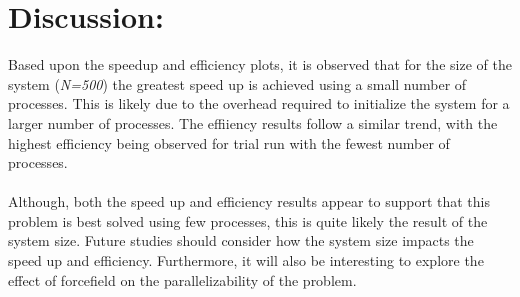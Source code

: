 \documentclass{article}
\begin{document}
\section*{Discussion:}
Based upon the speedup and efficiency plots, it is observed that
for the size of the system (\textit{N=500}) the greatest speed up
is achieved using a small number of processes.  This is likely
due to the overhead required to initialize the system for a larger
number of processes.
The effiiency results follow a similar trend, with the highest
efficiency being observed for trial run with the fewest number
of processes.\\\\
Although, both the speed up and efficiency results appear to 
support that this problem is best solved using few processes,
this is quite likely the result of the system size.  Future 
studies should consider how the system size impacts the
speed up and efficiency.  Furthermore, it will also be interesting
to explore the effect of forcefield on the parallelizability of 
the problem. 
\end{document}
